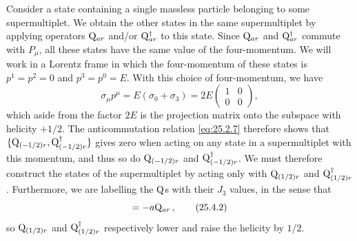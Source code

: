 Consider a state containing a single massless particle belonging to some
supermultiplet. We obtain the other states in the same supermultiplet by
applying operators $\mathrm{Q}_{ar}$ and/or $\mathrm{Q}^\dagger_{ar}$ to this state.
Since $\mathrm{Q}_{ar}$ and $\mathrm{Q}^\dagger_{ar}$ commute with $P_\mu$, all these
states have the same value of the four-momentum. We will work in a Lorentz
frame in which the four-momentum of these states is $p^1=p^2=0$ and
$p^3=p^0=E$. With this choice of four-momentum, we have
\begin{equation}
  \sigma_\mu p^\mu
  =E(\sigma_0+\sigma_3)
  =2E
  \begin{pmatrix}
    1&0\\
    0&0
  \end{pmatrix},
  \tag{25.4.1}\label{eq:25.4.1}
\end{equation}
which aside from the factor $2E$ is the projection matrix onto the subspace
with helicity $+1/2$. The anticommutation relation \eqref{eq:25.2.7} therefore
shows that
$\{\mathrm{Q}_{(-1/2)r},\mathrm{Q}^\dagger_{(-1/2)r}\}$ gives zero when acting on
any state in a supermultiplet with this momentum, and thus so do
$\mathrm{Q}_{(-1/2)r}$ and $\mathrm{Q}^\dagger_{(-1/2)r}$. We must therefore
construct the states of the supermultiplet by acting only with
$\mathrm{Q}_{(1/2)r}$ and $\mathrm{Q}^\dagger_{(1/2)r}$. Furthermore, we are
labelling the $\mathrm{Q}$s with their $J_3$ values, in the sense that
\begin{equation}
  [J_3,\WeylQ_{ar}]=-a\WeylQ_{ar}\,,
  \tag{25.4.2}\label{eq:25.4.2}
\end{equation}
so $\mathrm{Q}_{(1/2)r}$ and $\mathrm{Q}^\dagger_{(1/2)r}$ respectively lower and
raise the helicity by $1/2$.

